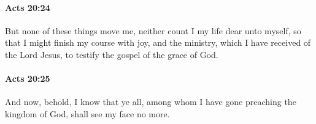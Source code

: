 		\paragraph{Acts 20:24} %
			\label{ACTS-20-24}

			But none of these things move me, neither count I my life dear unto myself, so that I might finish my course with joy, and the ministry, which I have received of the Lord Jesus, to testify the gospel of the grace of God.

			\begin{framed}
			\scriptsize
				\begin{compactdesc}
					\item[SBLG] 
				\end{compactdesc}
			\end{framed}

		\paragraph{Acts 20:25} %
			\label{ACTS-20-25}

			And now, behold, I know that ye all, among whom I have gone preaching the kingdom of God, shall see my face no more.

